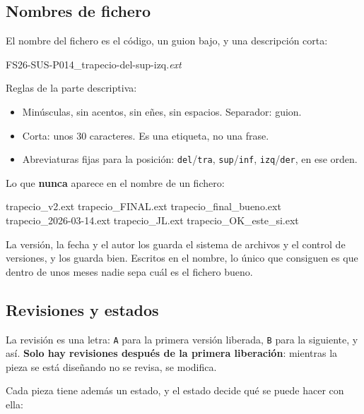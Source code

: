 \subsection{Nombres de fichero}

El nombre del fichero es el código, un guion bajo, y una descripción corta:

\begin{center}
\ttfamily\large FS26-SUS-P014\_trapecio-del-sup-izq.\textrm{\itshape ext}
\end{center}

Reglas de la parte descriptiva:

\begin{itemize}
  \item Minúsculas, sin acentos, sin eñes, sin espacios. Separador: guion.
  \item Corta: unos 30 caracteres. Es una etiqueta, no una frase.
  \item Abreviaturas fijas para la posición: \texttt{del}/\texttt{tra},
        \texttt{sup}/\texttt{inf}, \texttt{izq}/\texttt{der}, en ese orden.
\end{itemize}

\begin{ojo}
Lo que \textbf{nunca} aparece en el nombre de un fichero:

\begin{center}
\ttfamily\small
trapecio\_v2.ext \quad trapecio\_FINAL.ext \quad trapecio\_final\_bueno.ext\\
trapecio\_2026-03-14.ext \quad trapecio\_JL.ext \quad trapecio\_OK\_este\_si.ext
\end{center}

\noindent
La versión, la fecha y el autor los guarda el sistema de archivos y el control de
versiones, y los guarda bien. Escritos en el nombre, lo único que consiguen es que
dentro de unos meses nadie sepa cuál es el fichero bueno.
\end{ojo}

\subsection{Revisiones y estados}

La revisión es una letra: \texttt{A} para la primera versión liberada,
\texttt{B} para la siguiente, y así. \textbf{Solo hay revisiones después de la
primera liberación}: mientras la pieza se está diseñando no se revisa, se
modifica.

Cada pieza tiene además un estado, y el estado decide qué se puede hacer con ella:

